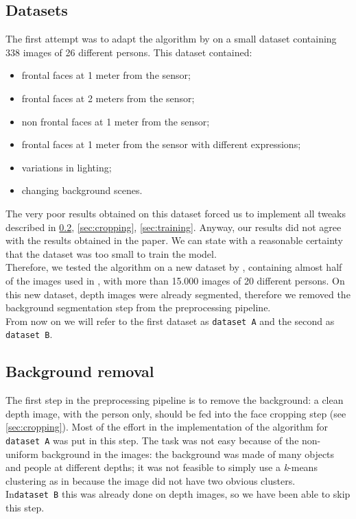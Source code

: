 \documentclass{article}
\begin{document}
	\subsection{Datasets}\label{sec:datasets}
	The first attempt was to adapt the algorithm by \citep{Hayat2016} on a small dataset containing 338 images of 26 different persons. This dataset contained:
	\begin{itemize}
		\item frontal faces at 1 meter from the sensor;
		\item frontal faces at 2 meters from the sensor;
		\item non frontal faces at 1 meter from the sensor;
		\item frontal faces at 1 meter from the sensor with different expressions;
		\item variations in lighting;
		\item changing background scenes.
	\end{itemize}
	The very poor results obtained on this dataset forced us to implement all tweaks described in \ref{sec:background}, \ref{sec:cropping}, \ref{sec:training}. Anyway, our results did not agree with the results obtained in the paper. We can state with a reasonable certainty that the dataset was too small to train the model. \\
	Therefore, we tested the algorithm on a new dataset by \citep{Fanelli2013}, containing almost half of the images used in \citep{Hayat2016}, with more than 15.000 images of 20 different persons. On this new dataset, depth images were already segmented, therefore we removed the background segmentation step from the preprocessing pipeline. \\
	From now on we will refer to the first dataset as \verb|dataset A| and the second as \verb|dataset B|.

	\subsection{Background removal} \label{sec:background}
	The first step in the preprocessing pipeline is to remove the background: a clean depth image, with the person only, should be fed into the face cropping step (see \ref{sec:cropping}). Most of the effort in the implementation of the algorithm for \verb|dataset A| was put in this step. The task was not easy because of the non-uniform background in the images: the background was made of many objects and people at different depths; it was not feasible to simply use a \textit{k}-means clustering as in \cite{Hayat2016} because the image did not have two obvious clusters. \\
	In\verb|dataset B| this was already done on depth images, so we have been able to skip this step. \\
\end{document}
